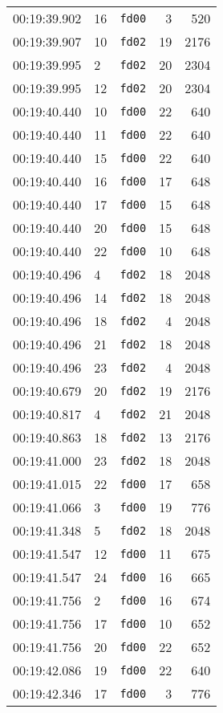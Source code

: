 \documentclass{article}
\begin{document}
\begin{longtable}{lllrr}
00:19:39.902 & 16 & \texttt{fd00} & 3 & 520 \\
00:19:39.907 & 10 & \texttt{fd02} & 19 & 2176 \\
00:19:39.995 & 2 & \texttt{fd02} & 20 & 2304 \\
00:19:39.995 & 12 & \texttt{fd02} & 20 & 2304 \\
00:19:40.440 & 10 & \texttt{fd00} & 22 & 640 \\
00:19:40.440 & 11 & \texttt{fd00} & 22 & 640 \\
00:19:40.440 & 15 & \texttt{fd00} & 22 & 640 \\
00:19:40.440 & 16 & \texttt{fd00} & 17 & 648 \\
00:19:40.440 & 17 & \texttt{fd00} & 15 & 648 \\
00:19:40.440 & 20 & \texttt{fd00} & 15 & 648 \\
00:19:40.440 & 22 & \texttt{fd00} & 10 & 648 \\
00:19:40.496 & 4 & \texttt{fd02} & 18 & 2048 \\
00:19:40.496 & 14 & \texttt{fd02} & 18 & 2048 \\
00:19:40.496 & 18 & \texttt{fd02} & 4 & 2048 \\
00:19:40.496 & 21 & \texttt{fd02} & 18 & 2048 \\
00:19:40.496 & 23 & \texttt{fd02} & 4 & 2048 \\
00:19:40.679 & 20 & \texttt{fd02} & 19 & 2176 \\
00:19:40.817 & 4 & \texttt{fd02} & 21 & 2048 \\
00:19:40.863 & 18 & \texttt{fd02} & 13 & 2176 \\
00:19:41.000 & 23 & \texttt{fd02} & 18 & 2048 \\
00:19:41.015 & 22 & \texttt{fd00} & 17 & 658 \\
00:19:41.066 & 3 & \texttt{fd00} & 19 & 776 \\
00:19:41.348 & 5 & \texttt{fd02} & 18 & 2048 \\
00:19:41.547 & 12 & \texttt{fd00} & 11 & 675 \\
00:19:41.547 & 24 & \texttt{fd00} & 16 & 665 \\
00:19:41.756 & 2 & \texttt{fd00} & 16 & 674 \\
00:19:41.756 & 17 & \texttt{fd00} & 10 & 652 \\
00:19:41.756 & 20 & \texttt{fd00} & 22 & 652 \\
00:19:42.086 & 19 & \texttt{fd00} & 22 & 640 \\
00:19:42.346 & 17 & \texttt{fd00} & 3 & 776 \\

\end{longtable}
\end{document}
